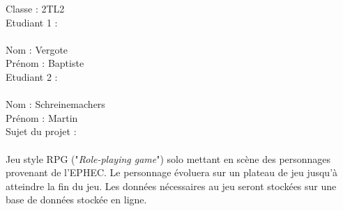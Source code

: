 \documentclass[8pt,a4paper,titlepage]{report}
\author{Baptiste Vergote & Martin Schreinemachers}
\begin{document}
\clearpage
\noindent
{\huge Classe : 2TL2}\\[3cm]
{\huge Etudiant 1 :}\\\\
Nom : Vergote\\
Prénom : Baptiste\\[3cm]
{\huge Etudiant 2 : }\\\\
Nom : Schreinemachers\\
Prénom : Martin\\[3cm]
{\huge Sujet du projet :}\\\\
Jeu style RPG ("\textit{Role-playing game}") solo mettant en scène des personnages provenant de l'EPHEC. Le personnage évoluera sur un plateau de jeu jusqu'à atteindre la fin du jeu. Les données nécessaires au jeu seront stockées sur une base de données stockée en ligne.
\end{document}
